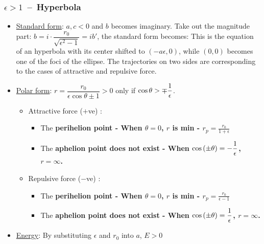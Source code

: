 \documentclass[class=article, crop=false, 12pt]{standalone}
\begin{document}
\subsubsection{$\epsilon>1$ \,--\, Hyperbola}

\begin{itemize}
    \item \ul{Standard form}: $a,c < 0$ and $b$ becomes imaginary. 
    Take out the magnitude part: $b=i\cdot \dfrac{r_0}{\sqrt{\epsilon^2-1}} = ib'$,
    the standard form becomes:
    This is the equation of an hyperbola with its center shifted to $(-a\epsilon,0)$,
    while $(0,0)$ becomes one of the foci of the ellipse.
    The trajectories on two sides are corresponding to the cases of attractive and repulsive force.

    \item \ul{Polar form}: $r=\dfrac{r_0}{\epsilon\cos\theta \pm 1} > 0$ only if $\cos\theta > \mp\dfrac{1}{\epsilon}$.
    \begin{itemize}
        \item Attractive force ($+$ve) : 
        
        \begin{itemize}
            \item The \bf{perihelion} point - When $\theta=0$, $r$ is min - $\boxed{r_p = \frac{r_0}{1+\epsilon}}$
            
            \item The \bf{aphelion} point does not exist - When $\cos\qty(\pm\theta) = -\dfrac{1}{\epsilon}$, $r=\infty$.
    
        \end{itemize}

        \item Repulsive force ($-$ve) : 
        \begin{itemize}
            \item The \bf{perihelion} point - When $\theta=0$, $r$ is min - $\boxed{r_p = \frac{r_0}{\epsilon-1}}$
            
            \item The \bf{aphelion} point does not exist - When $\cos\qty(\pm\theta) = \dfrac{1}{\epsilon}$, $r=\infty$.
    
        \end{itemize}
    \end{itemize}
        

    \item \ul{Energy}: By substituting $\epsilon$ and $r_0$ into $a$, $\boxed{E > 0}$
    

\end{itemize}
\end{document}
